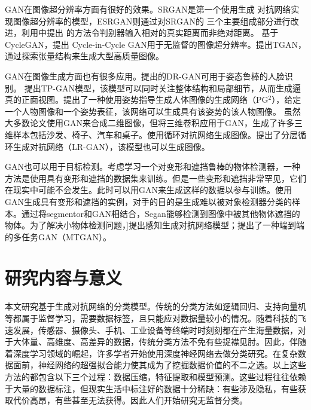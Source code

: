 GAN在图像超分辨率方面有很好的效果。SRGAN\cite{ledig2017photo}是第一个使用生成
对抗网络实现图像超分辨率的模型，ESRGAN\cite{wang2018esrgan}则通过对SRGAN的
三个主要组成部分进行改进，利用\citet{jolicoeur2018relativistic}中提出
的方法令判别器输入相对的真实距离而非绝对距离。
基于CycleGAN\cite{zhu2017unpaired}，\citet{yuan2018unsupervised}提出
Cycle-in-Cycle GAN用于无监督的图像超分辨率。\citet{ding2019tgan}提出TGAN，
通过探索张量结构来生成大型高质量图像。

GAN在图像生成方面也有很多应用。\citet{tran2017disentangled}提出的DR-GAN可用于姿态鲁棒的人脸识别。
\citet{huang2017beyond}提出TP-GAN模型，该模型可以同时关注整体结构和局部细节，从而生成逼真的正面视图。\citet{ma2017pose}提出了一种使用姿势指导生成人体图像的生成网络（PG$^2$），给定一个人物图像和一个姿势表征，该网络可以生成具有该姿势的该人物图像。
虽然大多数论文使用GAN来合成二维图像\cite{bao2017cvae,dong2017semantic}，但\citet{wu2016learning}将三维卷积应用于GAN，生成了许多三维样本包括沙发、椅子、汽车和桌子。\citet{im2016generating}使用循环对抗网络生成图像。\citet{yang2017lr}提出了分层循环生成对抗网络（LR-GAN），该模型也可以生成图像。

GAN也可以用于目标检测。考虑学习一个对变形和遮挡鲁棒的物体检测器，一种方法是使用具有变形和遮挡的数据集来训练。但是一些变形和遮挡非常罕见，它们在现实中可能不会发生。此时可以用GAN来生成这样的数据以参与训练。\citet{wang2017fast}使用GAN生成具有变形和遮挡的实例，对手的目的是生成难以被对象检测器分类的样本。通过将segmentor和GAN相结合，Segan\cite{ehsani2018segan}能够检测到图像中被其他物体遮挡的物体。为了解决小物体检测问题，\citet{li2017perceptual}]提出感知生成对抗网络模型；\citet{bai2018sod}提出了一种端到端的多任务GAN（MTGAN）。

\section{研究内容与意义}
本文研究基于生成对抗网络的分类模型。传统的分类方法如逻辑回归、支持向量机等都属于监督学习，需要数据标签，且只能应对数据量较小的情况。随着科技的飞速发展，传感器、摄像头、手机、工业设备等终端时时刻刻都在产生海量数据，对于大体量、高维度、高差异的数据，传统分类方法不免有些捉襟见肘。因此，伴随着深度学习领域的崛起，许多学者开始使用深度神经网络去做分类研究\cite{krizhevsky2012imagenet,taigman2014deepface}。在复杂数据面前，神经网络的超强拟合能力使其成为了挖掘数据价值的不二之选。以上这些方法的都包含以下三个过程：数据压缩，特征提取和模型预测。这些过程往往依赖于大量的数据标注，但现实生活中标注好的数据十分稀缺：有些涉及隐私，有些获取代价高昂，有些甚至无法获得。因此人们开始研究无监督分类。

